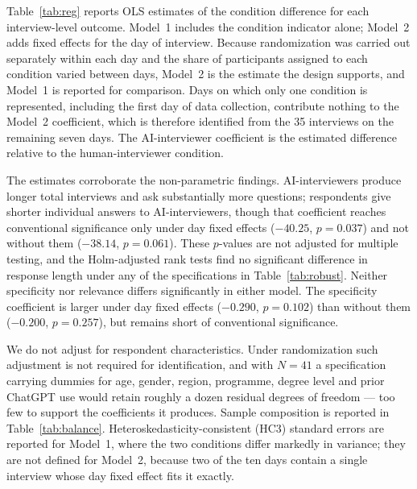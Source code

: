 \documentclass[12pt]{article}
\newcommand{\AII}{AI-interviewer}
\newcommand{\AIIs}{AI-interviewers}
\begin{document}
Table~\ref{tab:reg} reports OLS estimates of the condition difference for each interview-level outcome. Model~1 includes the condition indicator alone; Model~2 adds fixed effects for the day of interview. Because randomization was carried out separately within each day and the share of participants assigned to each condition varied between days, Model~2 is the estimate the design supports, and Model~1 is reported for comparison. Days on which only one condition is represented, including the first day of data collection, contribute nothing to the Model~2 coefficient, which is therefore identified from the 35 interviews on the remaining seven days. The \AII{} coefficient is the estimated difference relative to the human-interviewer condition.

The estimates corroborate the non-parametric findings. \AIIs{} produce longer total interviews and ask substantially more questions; respondents give shorter individual answers to \AIIs{}, though that coefficient reaches conventional significance only under day fixed effects ($-40.25$, $p = 0.037$) and not without them ($-38.14$, $p = 0.061$). These $p$-values are not adjusted for multiple testing, and the Holm-adjusted rank tests find no significant difference in response length under any of the specifications in Table~\ref{tab:robust}. Neither specificity nor relevance differs significantly in either model. The specificity coefficient is larger under day fixed effects ($-0.290$, $p = 0.102$) than without them ($-0.200$, $p = 0.257$), but remains short of conventional significance.

We do not adjust for respondent characteristics. Under randomization such adjustment is not required for identification, and with $N = 41$ a specification carrying dummies for age, gender, region, programme, degree level and prior ChatGPT use would retain roughly a dozen residual degrees of freedom --- too few to support the coefficients it produces. Sample composition is reported in Table~\ref{tab:balance}. Heteroskedasticity-consistent (HC3) standard errors are reported for Model~1, where the two conditions differ markedly in variance; they are not defined for Model~2, because two of the ten days contain a single interview whose day fixed effect fits it exactly.
\end{document}
